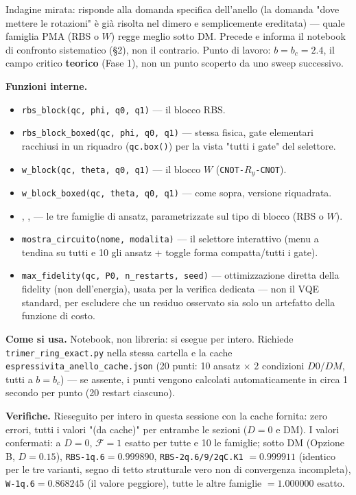\documentclass[11pt,a4paper]{article}
\begin{document}
Indagine mirata: risponde alla domanda specifica dell'anello (la domanda "dove
mettere le rotazioni" è già risolta nel dimero e semplicemente ereditata) — quale
famiglia PMA (RBS o $W$) regge meglio sotto DM. Precede e informa il notebook di
confronto sistematico (§2), non il contrario. Punto di lavoro: $b=b_c=2.4$, il
campo critico \textbf{teorico} (Fase 1), non un punto scoperto da uno sweep
successivo.

\textbf{Funzioni interne.}
\begin{itemize}
\item \texttt{rbs\_block(qc,\ phi,\ q0,\ q1)} — il blocco RBS.
\item \texttt{rbs\_block\_boxed(qc,\ phi,\ q0,\ q1)} — stessa fisica, gate
elementari racchiusi in un riquadro (\texttt{qc.box()}) per la vista "tutti i gate"
del selettore.
\item \texttt{w\_block(qc,\ theta,\ q0,\ q1)} — il blocco $W$
(\texttt{CNOT-}$R_y$\texttt{-CNOT}).
\item \texttt{w\_block\_boxed(qc,\ theta,\ q0,\ q1)} — come sopra, versione
riquadrata.
\item \texttt{},
\texttt{},
\texttt{} — le tre famiglie di ansatz,
parametrizzate sul tipo di blocco (RBS o $W$).
\item \texttt{mostra\_circuito(nome,\ modalita)} — il selettore interattivo (menu
a tendina su tutti e 10 gli ansatz + toggle forma compatta/tutti i gate).
\item \texttt{max\_fidelity(qc,\ P0,\ n\_restarts,\ seed)} — ottimizzazione diretta
della fidelity (non dell'energia), usata per la verifica dedicata — non il VQE
standard, per escludere che un residuo osservato sia solo un artefatto della
funzione di costo.
\end{itemize}

\textbf{Come si usa.} Notebook, non libreria: si esegue per intero. Richiede
\texttt{trimer\_ring\_exact.py} nella stessa cartella e la cache
\texttt{espressivita\_anello\_cache.json} (20 punti: 10 ansatz $\times$ 2 condizioni
$D0$/$DM$, tutti a $b=b_c$) — se assente, i punti vengono calcolati automaticamente
in circa 1 secondo per punto (20 restart ciascuno).

\textbf{Verifiche.} Rieseguito per intero in questa sessione con la cache fornita:
zero errori, tutti i valori "(da cache)" per entrambe le sezioni ($D=0$ e DM). I
valori confermati: a $D=0$, $\mathcal F=1$ esatto per tutte e 10 le famiglie; sotto
DM (Opzione B, $D=0.15$), \texttt{RBS-1q.6}$=0.999890$, \texttt{RBS-2q.6/9/2qC.K1}
$=0.999911$ (identico per le tre varianti, segno di tetto strutturale vero non di
convergenza incompleta), \texttt{W-1q.6}$=0.868245$ (il valore peggiore), tutte le
altre famiglie $=1.000000$ esatto.
\end{document}

